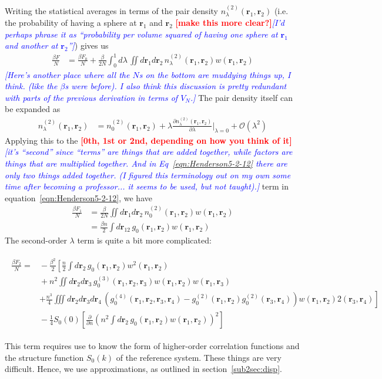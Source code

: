 \documentclass[letterpaper,twocolumn,amsmath,amssymb,prb]{revtex4-1}
\newcommand{\1}{\ensuremath{\textbf{r}_1}}
\newcommand{\2}{\ensuremath{\textbf{r}_2}}
\newcommand{\3}{\ensuremath{\textbf{r}_3}}
\newcommand{\4}{\ensuremath{\textbf{r}_4}}
\newcommand{\fixme}[1]{\textcolor{red}{\textbf{[#1]}}}
\newcommand{\davidsays}[1]{\textcolor{blue}{\textit{[#1]}}}
\begin{document}
Writing the statistical averages in terms of the pair density
$n_\lambda^{(2)}(\1,\2)$ (i.e. the probability of having a sphere at
\1 and \2 \fixme{make this more clear?}\davidsays{I'd perhaps phrase
  it as ``probability per volume squared of having one sphere at \1
  and another at \2''}) gives us
\begin{align}
  \frac{\beta F}{N} &= \frac{\beta F_0}{N} + \frac{\beta}{2N}\int_0^1 d\lambda\, \iint d\1 d\2\, n_\lambda^{(2)}(\1,\2)w(\1,\2) \label{eqn:Henderson5-2-12}
\end{align}
\davidsays{Here's another place where all the $N$s on the bottom are
  muddying things up, I think.  (like the $\beta$s were before).  I
  also think this discussion is pretty redundant with parts of the
  previous derivation in terms of $V_N$.}  The pair density itself can
be expanded as
\begin{align}
  n_\lambda^{(2)}(\1,\2) &= n_0^{(2)}(\1,\2) + \lambda\frac{\partial n_\lambda^{(2)}(\1,\2)}{\partial\lambda}\bigg|_{\lambda = 0} + \mathcal{O}(\lambda^2)
\end{align}
Applying this to the \fixme{0th, 1st or 2nd, depending on how you
  think of it}\davidsays{it's ``second'' since ``terms'' are things
  that are added together, while factors are things that are
  multiplied together.  And in Eq~\ref{eqn:Henderson5-2-12} there are
  only two things added together.  (I figured this terminology out on
  my own some time after becoming a professor... it seems to be used,
  but not taught).} term in equation~\ref{eqn:Henderson5-2-12}, we
have
\begin{align}
  \frac{\beta F_1}{N} &= \frac{\beta}{2N}\iint d\1 d\2\, n_0^{(2)}(\1,\2)w(\1,\2) \\
  &= \frac{\beta n}{2}\int d\mathbf{r}_{12}\, g_0(\1,\2)w(\1,\2)
\end{align}
The second-order $\lambda$ term is quite a bit more complicated:
\begin{widetext}
 \begin{align}
   \begin{split}
   \frac{\beta F_2}{N} =&{} -\frac{\beta^2}{2}\left[ \frac{n}{2}\int d\2\, g_0(\1,\2)w^2(\1,\2) \right. \\ &{} + n^2 \iint d\2 d\3\, g_0^{(3)}(\1,\2,\3)w(\1,\2)w(\1,\3) \\ &{} \left. + \frac{n^3}{4}\iiint d\2 d\3 d\4\, \left( g_0^{(4)}(\1,\2,\3,\4) - g_0^{(2)}(\1,\2)g_0^{(2)}(\3,\4) \right)w(\1,\2)2(\3,\4) \right] \\ &{} - \frac{1}{4}S_0(0)\left[ \frac{\partial}{\partial n}\left( n^2\int d\2\, g_0(\1,\2)w(\1,\2) \right)^2 \right]
   \end{split}
 \end{align}
\end{widetext}
This term requires use to know the form of higher-order correlation functions and the structure function $S_0(k)$ of the reference system. These things are very difficult. Hence, we use approximations, as outlined in section~\ref{sub2sec:disp}.
\end{document}
